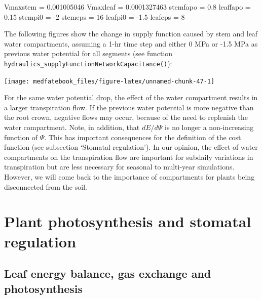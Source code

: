 \documentclass[]{book}
\newenvironment{Shaded}{\begin{snugshade}}{\end{snugshade}}
\newcommand{\DecValTok}[1]{\textcolor[rgb]{0.00,0.00,0.81}{#1}}
\newcommand{\FloatTok}[1]{\textcolor[rgb]{0.00,0.00,0.81}{#1}}
\newcommand{\StringTok}[1]{\textcolor[rgb]{0.31,0.60,0.02}{#1}}
\newcommand{\NormalTok}[1]{#1}
\begin{document}
\begin{Shaded}
\begin{Highlighting}[]
\NormalTok{Vmaxstem =}\StringTok{ }\FloatTok{0.001005046}
\NormalTok{Vmaxleaf =}\StringTok{ }\FloatTok{0.0001327463}
\NormalTok{stemfapo =}\StringTok{ }\FloatTok{0.8}
\NormalTok{leaffapo =}\StringTok{ }\FloatTok{0.15}
\NormalTok{stempi0 =}\StringTok{ }\DecValTok{-2}
\NormalTok{stemeps =}\StringTok{ }\DecValTok{16}
\NormalTok{leafpi0 =}\StringTok{ }\FloatTok{-1.5}
\NormalTok{leafeps =}\StringTok{ }\DecValTok{8}
\end{Highlighting}
\end{Shaded}

The following figures show the change in supply function caused by stem and leaf water compartments, assuming a 1-hr time step and either 0 MPa or -1.5 MPa as previous water potential for all segments (see function \texttt{hydraulics\_supplyFunctionNetworkCapacitance()}):

\begin{center}\texttt{[image: medfatebook\_files/figure-latex/unnamed-chunk-47-1]} \end{center}

For the same water potential drop, the effect of the water compartment results in a larger transpiration flow. If the previous water potential is more negative than the root crown, negative flows may occur, because of the need to replenish the water compartment. Note, in addition, that \(dE/d\Psi\) is no longer a non-increasing function of \(\Psi\). This has important consequences for the definition of the cost function (see subsection `Stomatal regulation'). In our opinion, the effect of water compartments on the transpiration flow are important for subdaily variations in transpiration but are less necessary for seasonal to multi-year simulations. However, we will come back to the importance of compartments for plants being disconnected from the soil.

\hypertarget{plant-photosynthesis-and-stomatal-regulation}{%
\chapter{Plant photosynthesis and stomatal regulation}\label{plant-photosynthesis-and-stomatal-regulation}}

\hypertarget{leaf-energy-balance-gas-exchange-and-photosynthesis}{%
\section{Leaf energy balance, gas exchange and photosynthesis}\label{leaf-energy-balance-gas-exchange-and-photosynthesis}}
\end{document}
